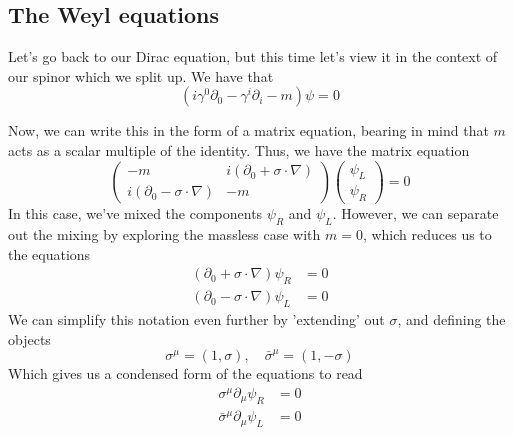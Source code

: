 \subsection{The Weyl equations} 
Let's go back to our Dirac equation, but this time let's view it in the context of our spinor which we split up. We have that \[ 
\left( i \gamma^0 \partial_0 - \gamma^i \partial_i - m  \right) \psi  = 0 \] 

Now, we can write this in the form of a matrix equation, bearing in mind that $m$ acts as a scalar multiple of the identity. Thus, we have the matrix equation \[ 
\begin{pmatrix} 
-m & i (\partial_0 + \sigma \cdot \nabla ) \\
i(\partial_0 - \sigma \cdot \nabla) & -m 
\end{pmatrix} 
\begin{pmatrix} 
\psi_L \\ \psi_R \end{pmatrix} = 0 
\]
In this case, we've mixed the components $\psi_R$ and $\psi_L $. However, we can separate out the mixing by exploring the massless case with $m = 0$, which reduces us to the equations 
\begin{align*}  
( \partial_0 + \sigma \cdot \nabla ) \psi_R & = 0 \\ 
( \partial_0 - \sigma \cdot \nabla ) \psi_L & = 0 
\end{align*} 
We can simplify this notation even further by 'extending' out $\sigma$, and defining the objects 
\[ \sigma^\mu = (1, \sigma ), \quad \bar{ \sigma}^\mu = ( 1,  - \sigma ) \] 
Which gives us a condensed form of the equations to read \begin{align*}  
\sigma^\mu \partial_\mu \psi_R & = 0 \\
\bar{\sigma}^\mu \partial_\mu \psi_L & = 0 
\end{align*} 

